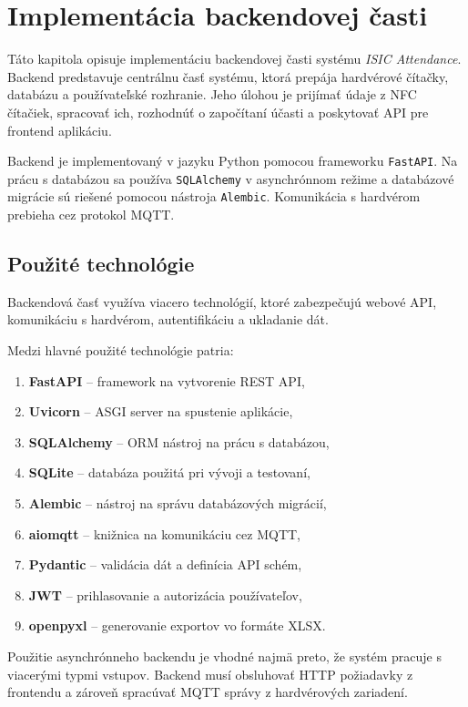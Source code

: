 \chapter{Implementácia backendovej časti}
\label{chap:backend-implementation}

Táto kapitola opisuje implementáciu backendovej časti systému \textit{ISIC Attendance}. Backend predstavuje centrálnu časť systému, ktorá prepája hardvérové čítačky, databázu a používateľské rozhranie. Jeho úlohou je prijímať údaje z NFC čítačiek, spracovať ich, rozhodnúť o započítaní účasti a poskytovať API pre frontend aplikáciu.

Backend je implementovaný v jazyku Python pomocou frameworku \texttt{FastAPI}. Na prácu s databázou sa používa \texttt{SQLAlchemy} v asynchrónnom režime a databázové migrácie sú riešené pomocou nástroja \texttt{Alembic}. Komunikácia s hardvérom prebieha cez protokol MQTT.

\section{Použité technológie}
\label{sec:backend-technologies}

Backendová časť využíva viacero technológií, ktoré zabezpečujú webové API, komunikáciu s hardvérom, autentifikáciu a ukladanie dát.

Medzi hlavné použité technológie patria:
\begin{enumerate}
    \item \textbf{FastAPI} -- framework na vytvorenie REST API,
    \item \textbf{Uvicorn} -- ASGI server na spustenie aplikácie,
    \item \textbf{SQLAlchemy} -- ORM nástroj na prácu s databázou,
    \item \textbf{SQLite} -- databáza použitá pri vývoji a testovaní,
    \item \textbf{Alembic} -- nástroj na správu databázových migrácií,
    \item \textbf{aiomqtt} -- knižnica na komunikáciu cez MQTT,
    \item \textbf{Pydantic} -- validácia dát a definícia API schém,
    \item \textbf{JWT} -- prihlasovanie a autorizácia používateľov,
    \item \textbf{openpyxl} -- generovanie exportov vo formáte XLSX.
\end{enumerate}

Použitie asynchrónneho backendu je vhodné najmä preto, že systém pracuje s viacerými typmi vstupov. Backend musí obsluhovať HTTP požiadavky z frontendu a zároveň spracúvať MQTT správy z hardvérových zariadení.

